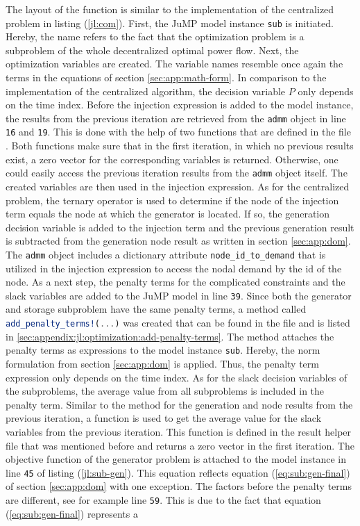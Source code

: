 The layout of the function is similar to the implementation of the centralized problem in listing (\ref{jl:com}). First, the JuMP model instance \lstinline[language=julia]{sub} is initiated. Hereby, the name refers to the fact that the optimization problem is a subproblem of the whole decentralized optimal power flow. Next, the optimization variables are created. The variable names resemble once again the terms in the equations of section \ref{sec:app:math-form}. In comparison to the implementation of the centralized algorithm, the decision variable $P$ only depends on the time index. Before the injection expression is added to the model instance, the results from the previous iteration are retrieved from the \lstinline[language=julia]{admm} object in line \texttt{16} and \texttt{19}. This is done with the help of two functions that are defined in the file . Both functions make sure that in the first iteration, in which no previous results exist, a zero vector for the corresponding variables is returned. Otherwise, one could easily access the previous iteration results from the \lstinline[language=julia]{admm} object itself. The created variables are then used in the injection expression. As for the centralized problem, the ternary operator is used to determine if the node of the injection term equals the node at which the generator is located. If so, the generation decision variable is added to the injection term and the previous generation result is subtracted from the generation node result as written in section \ref{sec:app:dom}. The \lstinline[language=julia]{admm} object includes a dictionary attribute \lstinline[language=julia]{node_id_to_demand} that is utilized in the injection expression to access the nodal demand by the id of the node. As a next step, the penalty terms for the complicated constraints and the slack variables are added to the JuMP model in line \texttt{39}. Since both the generator and storage subproblem have the same penalty terms, a method called \lstinline[language=julia]{add_penalty_terms!(...)} was created that can be found in the file  and is listed in \ref{sec:appendix:jl:optimization:add-penalty-terms}. The method attaches the penalty terms as expressions to the model instance \lstinline[language=julia]{sub}. Hereby, the norm formulation from section \ref{sec:app:dom} is applied. Thus, the penalty term expression only depends on the time index. As for the slack decision variables of the subproblems, the average value from all subproblems is included in the penalty term. Similar to the method for the generation and node results from the previous iteration, a function is used to get the average value for the slack variables from the previous iteration. This function is defined in the result helper file that was mentioned before and returns a zero vector in the first iteration. The objective function of the generator problem is attached to the model instance in line \texttt{45} of listing (\ref{jl:sub-gen}). This equation reflects equation (\ref{eq:sub:gen-final}) of section \ref{sec:app:dom} with one exception. The factors before the penalty terms are different, see for example line \texttt{59}. This is due to the fact that equation (\ref{eq:sub:gen-final}) represents a 